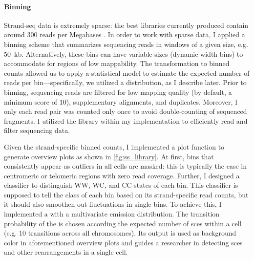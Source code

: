 \paragraph{Binning}
Strand-seq data is extremely sparse: the best libraries currently produced
contain around 300 reads per Megabases \citep{Chaisson2017,Sanders2017}. In
order to work with sparse data, I applied a binning scheme that summarizes
sequencing reads in windows of a given size, e.g. 50~kb. Alternatively, these
bins can have variable sizes (dynamic-width bins) to accommodate for regions of
low mappability. The transformation to binned counts allowed us to apply a
statistical model to estimate the expected number of reads per
bin---specifically, we utilized a \nb distribution, as I describe
later. Prior to binning, sequencing reads are filtered for low mapping quality
(by default, a minimum score of 10), supplementary alignments, and \pcr duplicates.
Moreover, I only each read pair was counted only once to avoid double-counting of
sequenced fragments. I utilized the \htslib library within my implementation
to efficiently read and filter sequencing data.

Given the strand-specific binned counts, I implemented a plot function to
generate overview plots as shown in \cref{fig:ss_library}. At first, bins that
consistently appear as outliers in all cells are masked: this is typically the
case in centromeric or telomeric regions with zero read coverage. Further, I designed a classifier to
distinguish WW, WC, and CC states of each bin. This classifier is supposed to
tell the class of each bin based on its strand-specific read counts, but it
should also smoothen out fluctuations in single bins.
To achieve this, I implemented a \hmm with a multivariate \nb
emission distribution. The transition probability of the \hmm is chosen
according the expected number of \acp{sce} within a cell (e.g. 10 transitions
across all chromosomes). Its output is used as background color in
aforementioned overview plots and guides a researcher in detecting \acp{sce} and
other rearrangements in a single cell.

